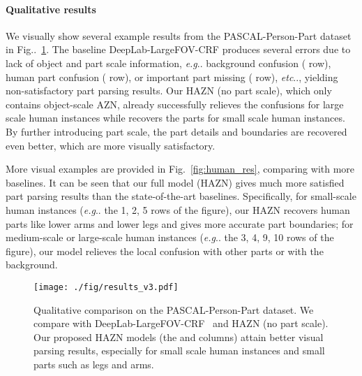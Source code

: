 \documentclass[runningheads]{llncs}
\makeatletter
\newcommand{\figref}[1]{Fig\onedot~\ref{#1}}
\DeclareRobustCommand\onedot{\futurelet\@let@token\@onedot}
\def\@onedot{\ifx\@let@token.\else.\null\fi\xspace}
\def\eg{\emph{e.g}\onedot} \def\Eg{\emph{E.g}\onedot}
\def\etc{\emph{etc}\onedot} \def\vs{\emph{vs}\onedot}
\makeatother
\begin{document}
\begin{table}[!b]
\centering
  \setlength{\tabcolsep}{10pt}
  \caption{Instance-wise part parsing accuracy on PASCAL-Person-Part in terms of .}
 \vspace{-1.\baselineskip}
  \label{table:apr_part}
\end{table}  

\paragraph{Qualitative results} We visually show several example results from the PASCAL-Person-Part dataset in \figref{fig:seg_image}. The baseline DeepLab-LargeFOV-CRF produces several errors due to lack of object and part scale information, \eg background confusion ( row), human part confusion ( row), or important part missing ( row), \etc, yielding non-satisfactory part parsing results. Our HAZN (no part scale), which only contains object-scale AZN, already successfully relieves the confusions for large scale human instances while recovers the parts for small scale human instances. By further introducing part scale, the part details and boundaries are recovered even better, which are more visually satisfactory.

More visual examples are provided in Fig.~\ref{fig:human_res}, comparing with more baselines. It can be seen that our full model (HAZN) gives much more satisfied part parsing results than the state-of-the-art baselines. Specifically, for small-scale human instances (\eg the 1, 2, 5 rows of the figure), our HAZN recovers human parts like lower arms and lower legs and gives more accurate part boundaries; for medium-scale or large-scale human instances (\eg the 3, 4, 9, 10 rows of the figure), our model relieves the local confusion with other parts or with the background.

\begin{figure} [t]
\vspace{-0.1\baselineskip}
\centering
\texttt{[image: ./fig/results\_v3.pdf]}
\vspace{-1.0\baselineskip}
\caption{Qualitative comparison on the PASCAL-Person-Part dataset. We compare with DeepLab-LargeFOV-CRF~\cite{chen2014semantic} and HAZN (no part scale). Our proposed HAZN models (the  and  columns) attain better visual parsing results, especially for small scale human instances and small parts such as legs and arms.}
\vspace{-1.6\baselineskip}
\label{fig:seg_image}
\end{figure}
\end{document}

